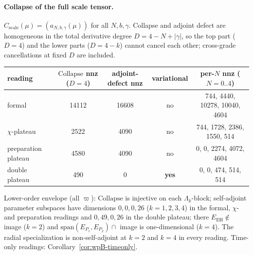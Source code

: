 \documentclass{article}
\theoremstyle{remark}
\newcommand{\Coll}{\mathrm{Collapse}}
\begin{document}
\paragraph{Collapse of the full scale tensor.}
$C_{\mathrm{scale}}(\mu)=(a_{N,b,\gamma}(\mu))$ for all $N,b,\gamma$.
Collapse and adjoint defect are homogeneous in the total derivative degree $D=4-N+|\gamma|$, so the top part ($D=4$) and the lower parts ($D=4-k$) cannot cancel each other; cross-grade cancellations at fixed $D$ are included.
\begin{center}
\small
\begin{tabular}{lcccc}
\hline
reading & $\Coll$ nnz ($D=4$) & adjoint-defect nnz & variational & per-$N$ nnz ($N=0..4$)\\
\hline
formal & 14112 & 16608 & no & 744, 4440, 10278, 10040, 4604\\
$\chi$-plateau & 2522 & 4090 & no & 744, 1728, 2386, 1550, 514\\
preparation plateau & 4580 & 4090 & no & 0, 0, 2274, 4072, 4604\\
double plateau & 490 & 0 & \textbf{yes} & 0, 0, 474, 514, 514\\
\hline
\end{tabular}
\normalsize
\end{center}
Lower-order envelope (all $\varpi$): $\Coll$ is injective on each $\Lambda_k$-block; self-adjoint parameter subspaces have dimensions $0,0,0,26$ ($k=1,2,3,4$) in the formal, $\chi$- and preparation readings and $0,49,0,26$ in the double plateau; there $E_{\mathrm{EH}}\notin$ image ($k=2$) and $\mathrm{span}(E_{P_1},E_{P_2})\cap$ image is one-dimensional ($k=4$).
The radial specialization is non-self-adjoint at $k=2$ and $k=4$ in every reading.
Time-only readings: Corollary~\ref{cor:wpB-timeonly}.
\end{document}
